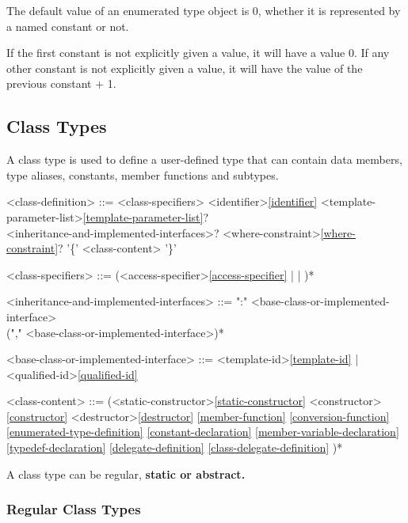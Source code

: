 \documentclass[a4paper,oneside,11pt]{article}
\begin{document}
The default value of an enumerated type object is 0, whether it is represented by a named constant or not.

If the first constant is not explicitly given a value, it will have a value 0.
If any other constant is not explicitly given a value, it will have the value of the previous constant + 1.

\subsection{Class Types}\label{sec:classtypes}

A class type is used to define a user-defined type that can contain data members, type aliases, constants, member functions and subtypes.

\begin{grammar}
\label{class-definition}<class-definition> ::= <class-specifiers>  <identifier>\ref{identifier} <template-parameter-list>\ref{template-parameter-list}?\\
<inheritance-and-implemented-interfaces>? <where-constraint>\ref{where-constraint}? '\{' <class-content> '\}'

<class-specifiers> ::= (<access-specifier>\ref{access-specifier} |  | )*

<inheritance-and-implemented-interfaces> ::= ":" <base-class-or-implemented-interface>\\
("," <base-class-or-implemented-interface>)*

<base-class-or-implemented-interface> ::= <template-id>\ref{template-id} | <qualified-id>\ref{qualified-id}

<class-content> ::= (<static-constructor>\ref{static-constructor}
\alt <constructor>\ref{constructor}
\alt <destructor>\ref{destructor}
\ref{member-function}
\ref{conversion-function}
\ref{enumerated-type-definition}
\ref{constant-declaration}
\ref{member-variable-declaration}
\ref{typedef-declaration}
\ref{delegate-definition}
\ref{class-delegate-definition}
)*
\end{grammar}

A class type can be regular, \bf{static} or \bf{abstract}.

\subsubsection{Regular Class Types}
\end{document}
